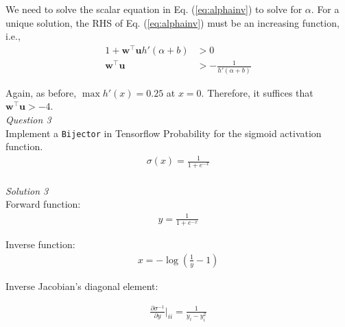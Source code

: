 \documentclass{article}
\begin{document}
We need to solve the scalar equation in Eq. (\ref{eq:alphainv}) to solve for $\alpha$. For a unique solution, the RHS of Eq. (\ref{eq:alphainv}) must be an increasing function, i.e.,
\begin{align*}
    1 + \mathbf{w}^\top\mathbf{u}h'(\alpha + b) &> 0\\
    \mathbf{w}^\top\mathbf{u} &> -\frac{1}{h'(\alpha + b)}
\end{align*}

Again, as before, $\max h'(x) = 0.25$ at $x=0$. Therefore, it suffices that $\mathbf{w}^\top\mathbf{u}>-4$.
\\[10pt]
\noindent\emph{Question 3}
\\[3pt]
Implement a \texttt{Bijector} in Tensorflow Probability for the sigmoid activation function.
\begin{align*}
\sigma(x) = \frac{1}{1 + e^{-x}}
\end{align*}
\\[10pt]
\emph{Solution 3}
\\[3pt]
Forward function: 
\begin{align*}
y = \frac{1}{1 + e^{-x}}
\end{align*}

\noindent Inverse function:
\begin{align*}
x = -\log\left(\frac{1}{y} - 1\right)
\end{align*}

\noindent Inverse Jacobian's diagonal element:

\begin{align*}
\frac{\partial \sigma^{-1}}{\partial y}\Bigg|_{ii} = \frac{1}{y_i - y_i^2}
\end{align*}

\inputminted[linenos=true,frame=lines,framesep=2mm]{python}{sigmoid.py}
\end{document}
